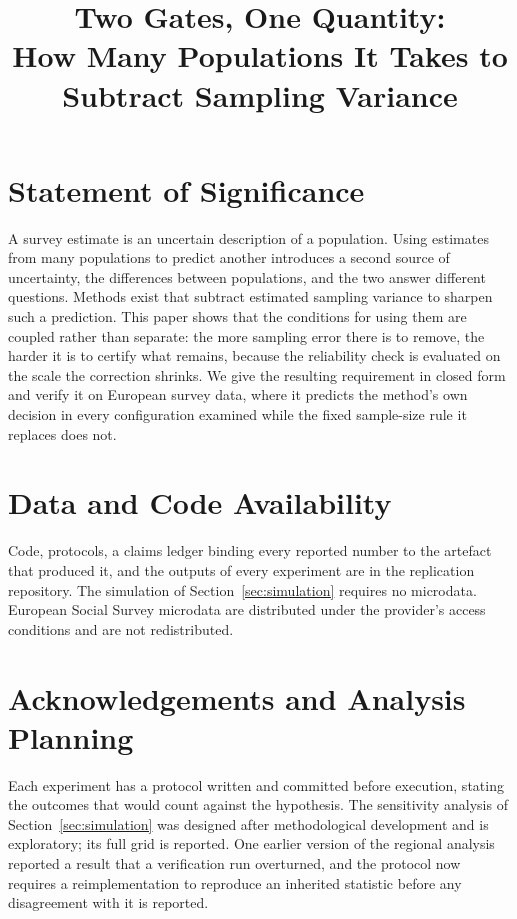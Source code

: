 \documentclass[12pt,letterpaper]{article}
\title{Two Gates, One Quantity:\\
How Many Populations It Takes to Subtract Sampling Variance}
\date{}
\begin{document}
\maketitle
\vspace{-3em}

\begin{abstract}\noindent\end{abstract}

\section*{Statement of Significance}
A survey estimate is an uncertain description of a population. Using estimates
from many populations to predict another introduces a second source of
uncertainty, the differences between populations, and the two answer different
questions. Methods exist that subtract estimated sampling variance to sharpen
such a prediction. This paper shows that the conditions for using them are
coupled rather than separate: the more sampling error there is to remove, the
harder it is to certify what remains, because the reliability check is
evaluated on the scale the correction shrinks. We give the resulting
requirement in closed form and verify it on European survey data, where it
predicts the method's own decision in every configuration examined while the
fixed sample-size rule it replaces does not.














\section*{Data and Code Availability}
Code, protocols, a claims ledger binding every reported number to the artefact
that produced it, and the outputs of every experiment are in the replication
repository. The simulation of Section~\ref{sec:simulation} requires no
microdata. European Social Survey microdata are distributed under the
provider's access conditions and are not redistributed.

\section*{Acknowledgements and Analysis Planning}
Each experiment has a protocol written and committed before execution, stating
the outcomes that would count against the hypothesis. The sensitivity analysis
of Section~\ref{sec:simulation} was designed after methodological development
and is exploratory; its full grid is reported. One earlier version of the
regional analysis reported a result that a verification run overturned, and the
protocol now requires a reimplementation to reproduce an inherited statistic
before any disagreement with it is reported.



\end{document}
